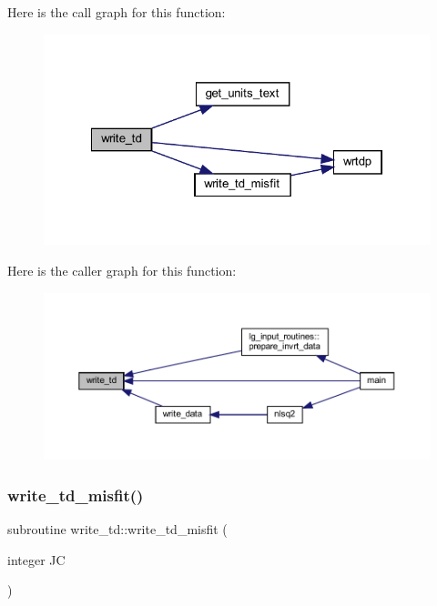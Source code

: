 Here is the call graph for this function\+:\nopagebreak
\begin{figure}[H]
\begin{center}
\leavevmode
\includegraphics[width=322pt]{Leroi_8f90_a050575d7cd77b6819922e9b6aa765af7_cgraph}
\end{center}
\end{figure}
Here is the caller graph for this function\+:\nopagebreak
\begin{figure}[H]
\begin{center}
\leavevmode
\includegraphics[width=350pt]{Leroi_8f90_a050575d7cd77b6819922e9b6aa765af7_icgraph}
\end{center}
\end{figure}
\mbox{\label{Leroi_8f90_ae92c690eb0a03d9faf58627a9777375f}} 
\subsubsection{\texorpdfstring{write\+\_\+td\+\_\+misfit()}{write\_td\_misfit()}}
{\footnotesize\ttfamily subroutine write\+\_\+td\+::write\+\_\+td\+\_\+misfit (\begin{DoxyParamCaption}\item[{integer}]{JC }\end{DoxyParamCaption})}

